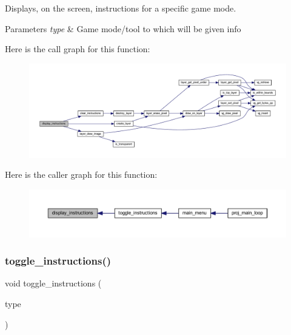 Displays, on the screen, instructions for a specific game mode. 


\begin{DoxyParams}{Parameters}
{\em type} & Game mode/tool to which will be given info \\
\hline
\end{DoxyParams}
Here is the call graph for this function\+:\nopagebreak
\begin{figure}[H]
\begin{center}
\leavevmode
\includegraphics[width=350pt]{group__game__info_ga6b00da117e65804d334e303e48a33a49_cgraph}
\end{center}
\end{figure}
Here is the caller graph for this function\+:\nopagebreak
\begin{figure}[H]
\begin{center}
\leavevmode
\includegraphics[width=350pt]{group__game__info_ga6b00da117e65804d334e303e48a33a49_icgraph}
\end{center}
\end{figure}
\mbox{\label{group__game__info_gaa555b2189fe80ff7c8095d0c80353c2d}} 
\subsubsection{\texorpdfstring{toggle\+\_\+instructions()}{toggle\_instructions()}}
{\footnotesize\ttfamily void toggle\+\_\+instructions (\begin{DoxyParamCaption}\item[{\mbox{\hyperlink{group__game__info_ga4fab2721054fd66cc89f138fd029fd1f}{Info\+Type}}}]{type }\end{DoxyParamCaption})}



